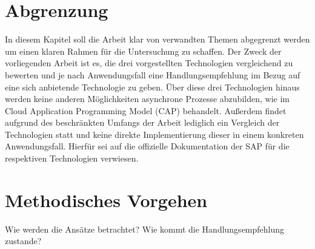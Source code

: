 \section{Abgrenzung}

In diesem Kapitel soll die Arbeit klar von verwandten Themen abgegrenzt werden um einen klaren Rahmen für die Untersuchung zu schaffen. Der Zweck der vorliegenden Arbeit ist es, die drei vorgestellten Technologien vergleichend zu bewerten und je nach Anwendungsfall eine Handlungsempfehlung im Bezug auf eine sich anbietende Technologie zu geben. Über diese drei Technologien hinaus werden keine anderen Möglichkeiten asynchrone Prozesse abzubilden, wie \zB im Cloud Application Programming Model (CAP) behandelt. Au{\ss}erdem findet aufgrund des beschränkten Umfangs der Arbeit lediglich ein Vergleich der Technologien statt und keine direkte Implementierung dieser in einem konkreten Anwendungsfall. Hierfür sei auf die offizielle Dokumentation der SAP für die respektiven Technologien verwiesen.

\section{Methodisches Vorgehen}

Wie werden die Ansätze betrachtet? Wie kommt die Handlungsempfehlung zustande?